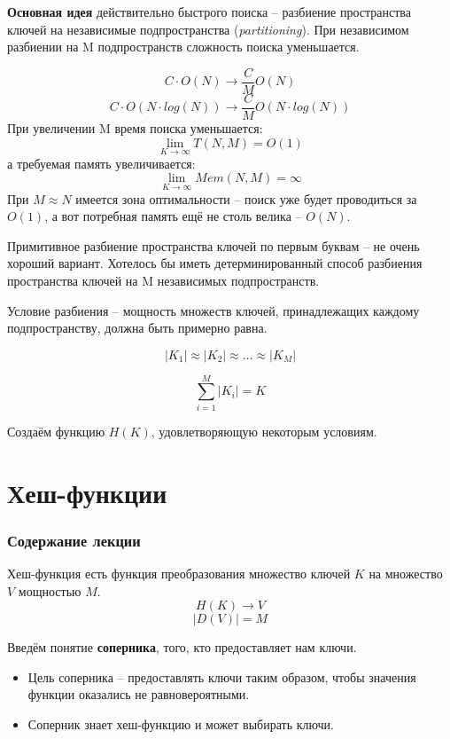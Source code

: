 \documentclass{beamer}
\begin{document}
\begin{frame}[t]
	\textbf{Основная идея} действительно быстрого поиска -- разбиение пространства ключей на независимые подпространства (\textit{partitioning}). При независимом разбиении на M подпространств сложность поиска уменьшается.

    \[ C \cdot O(N) \rightarrow \frac{C}{M}O(N) \]
    \[ C \cdot O(N\cdot log(N)) \rightarrow \frac{C}{M}O(N\cdot log(N)) \]
    При увеличении M время поиска уменьшается:
    \[ \lim_{K\to\infty} T(N,M) = O(1)\]
    а требуемая память увеличивается:
    \[ \lim_{K\to\infty} Mem(N,M) = \infty\]
    При $M \approx N$ имеется зона оптимальности -- поиск уже будет проводиться за $O(1)$, а вот потребная память ещё не столь велика -- $O(N)$.
\end{frame}

\begin{frame}[t]
	Примитивное разбиение пространства ключей по первым буквам -- не
очень хороший вариант. Хотелось бы иметь детерминированный способ разбиения пространства ключей на M независимых подпространств. 

    Условие разбиения -- мощность множеств ключей, принадлежащих каждому подпространству, должна быть примерно равна.

    \[ |K_1| \approx |K_2| \approx ... \approx |K_M|\]
    
    \[ \sum_{i=1}^{M} |K_i|=K\]
    
    Создаём функцию $H(K)$, удовлетворяющую некоторым условиям.
\end{frame}

\section{Хеш-функции}

\begin{frame}
  \frametitle{Содержание лекции}
  \tableofcontents[current]
\end{frame}

\begin{frame}[t]
    \begin{block}{Хеш-функция}
        есть функция преобразования множество ключей $K$ на множество $V$ мощностью $M$.
        \[H(K)\to V\]
        \[|D(V)|=M\]
        
    \end{block}
    
	Введём понятие \textbf{соперника}, того, кто предоставляет нам ключи. 
	\begin{itemize}
	    \item Цель соперника -- предоставлять ключи таким образом, чтобы значения функции оказались не равновероятными.
	    \item Соперник знает хеш-функцию и может выбирать ключи.
	\end{itemize}
\end{frame}
\end{document}
